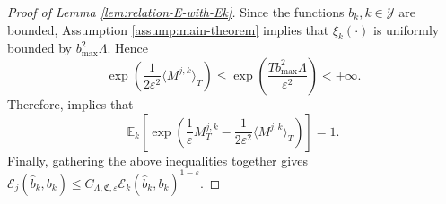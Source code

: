 \documentclass{article}
\theoremstyle{plain}
\theoremstyle{definition}
\theoremstyle{remark}
\newcommand{\PP}{\mathbb{P}}
\newcommand{\EE}{\mathbb{E}}
\newcommand{\calY}{\mathcal{Y}}
\begin{document}
\begin{proof}[Proof of Lemma \ref{lem:relation-E-with-Ek}]
Since the functions $b_k, k\in\calY$ are bounded, Assumption \ref{assump:main-theorem} implies that  $\xi_k(\cdot)$ is uniformly bounded by $b_{\max}^2 \Lambda$. Hence 
\[\exp\left(\frac{1}{2\varepsilon^2}\langle M^{j,k}\rangle_T\right)\leq \exp\left(\frac{Tb_{\max}^2 \Lambda}{\varepsilon^2}\right)<+\infty.\]
Therefore, \citet[Proposition 5.12 and Corollary 5.13]{karatzas1991brownian} implies that 
\[\EE_k \left[\exp\left(\frac{1}{\varepsilon}M_T^{j,k}-\frac{1}{2\varepsilon^2}\langle M^{j,k}\rangle_T\right)\right]=1. \]
Finally, gathering the above inequalities together gives 
$\mathcal{E}_j(\widehat b_k,b_k)\leq C_{\Lambda, \mathfrak{C}, \varepsilon}\mathcal{E}_k(\widehat b_k,b_k)^{1-\varepsilon}$.\end{proof}

\end{document}
